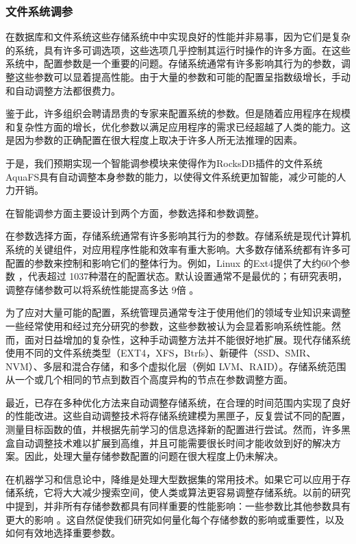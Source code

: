\subsubsection{文件系统调参}

在数据库和文件系统这些存储系统中中实现良好的性能并非易事，因为它们是复杂的系统，具有许多可调选项，这些选项几乎控制其运行时操作的许多方面。在这些系统中，配置参数是一个重要的问题。存储系统通常有许多影响其行为的参数，调整这些参数可以显着提高性能。由于大量的参数和可能的配置呈指数级增长，手动和自动调整方法都很费力。

鉴于此，许多组织会聘请昂贵的专家来配置系统的参数。但是随着应用程序在规模和复杂性方面的增长，优化参数以满足应用程序的需求已经超越了人类的能力。这是因为参数的正确配置在很大程度上取决于许多人所无法推理的因素。

于是，我们预期实现一个智能调参模块来使得作为RocksDB插件的文件系统AquaFS具有自动调整本身参数的能力，以使得文件系统更加智能，减少可能的人力开销。

在智能调参方面主要设计到两个方面，参数选择和参数调整。

在参数选择方面，存储系统通常有许多影响其行为的参数。存储系统是现代计算机系统的关键组件，对应用程序性能和效率有重大影响。大多数存储系统都有许多可配置的参数来控制和影响它们的整体行为。例如，Linux 的Ext4提供了大约60个参数 \cite{ext4doc}，代表超过 1037种潜在的配置状态。默认设置通常不是最优的；有研究表明，调整存储参数可以将系统性能提高多达 9倍 \cite{Sehgal2010EvaluatingPA}。

为了应对大量可能的配置，系统管理员通常专注于使用他们的领域专业知识来调整一些经常使用和经过充分研究的参数，这些参数被认为会显着影响系统性能。然而，面对日益增加的复杂性，这种手动调整方法并不能很好地扩展。现代存储系统使用不同的文件系统类型（EXT4，XFS，Btrfs）、新硬件（SSD、SMR、NVM）、多层和混合存储，和多个虚拟化层（例如 LVM、RAID）。存储系统范围从一个或几个相同的节点到数百个高度异构的节点在参数调整方面。

最近，已存在多种优化方法来自动调整存储系统，在合理的时间范围内实现了良好的性能改进\cite{10.5555/3277355.3277441,10.1145/3545008.3545012}。这些自动调整技术将存储系统建模为黑匣子，反复尝试不同的配置，测量目标函数的值，并根据先前学习的信息选择新的配置进行尝试。然而，许多黑盒自动调整技术难以扩展到高维，并且可能需要很长时间才能收敛到好的解决方案。因此，处理大量存储参数配置的问题在很大程度上仍未解决。

在机器学习和信息论中，降维是处理大型数据集的常用技术。如果它可以应用于存储系统，它将大大减少搜索空间，使人类或算法更容易调整存储系统。以前的研究中提到，并非所有存储参数都具有同样重要的性能影响：一些参数比其他参数具有更大的影响 \cite{10.5555/3277355.3277441}。这自然促使我们研究如何量化每个存储参数的影响或重要性，以及如何有效地选择重要参数。


